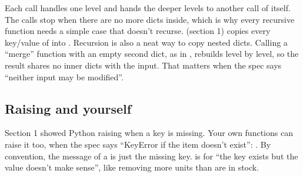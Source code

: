 \documentclass[10pt,a4paper]{article}
\begin{document}
Each call handles one level and hands the deeper levels to another call of itself. The calls stop when there are no more dicts inside, which is why every recursive function needs a simple case that doesn’t recurse.
 (section 1) copies every key/value of  into .
Recursion is also a neat way to copy nested dicts. Calling a “merge” function with an empty second dict, as in , rebuilds  level by level, so the result shares no inner dicts with the input. That matters when the spec says “neither input may be modified”.
\subsection{Raising  and  yourself}
Section 1 showed Python raising  when a key is missing. Your own functions can raise it too, when the spec says “KeyError if the item doesn’t exist”: . By convention, the message of a  is just the missing key.  is for “the key exists but the value doesn’t make sense”, like removing more units than are in stock.
\end{document}
